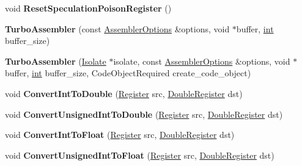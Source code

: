 \begin{DoxyCompactItemize}
void {\bfseries Reset\+Speculation\+Poison\+Register} ()
\item 
\mbox{\label{classv8_1_1internal_1_1TurboAssembler_ac5a1cdee47961f289dbb095cc534ef95}} 
{\bfseries Turbo\+Assembler} (const \mbox{\hyperlink{structv8_1_1internal_1_1AssemblerOptions}{Assembler\+Options}} \&options, void $\ast$buffer, \mbox{\hyperlink{classint}{int}} buffer\+\_\+size)
\item 
\mbox{\label{classv8_1_1internal_1_1TurboAssembler_ac5d3c303e7abed78a6c1fe7f9834c045}} 
{\bfseries Turbo\+Assembler} (\mbox{\hyperlink{classv8_1_1internal_1_1Isolate}{Isolate}} $\ast$isolate, const \mbox{\hyperlink{structv8_1_1internal_1_1AssemblerOptions}{Assembler\+Options}} \&options, void $\ast$buffer, \mbox{\hyperlink{classint}{int}} buffer\+\_\+size, Code\+Object\+Required create\+\_\+code\+\_\+object)
\item 
\mbox{\label{classv8_1_1internal_1_1TurboAssembler_a4192ffa653fd9d0538fb99353172bc9e}} 
void {\bfseries Convert\+Int\+To\+Double} (\mbox{\hyperlink{classv8_1_1internal_1_1Register}{Register}} src, \mbox{\hyperlink{classv8_1_1internal_1_1DoubleRegister}{Double\+Register}} dst)
\item 
\mbox{\label{classv8_1_1internal_1_1TurboAssembler_a30fd4cc55b4b8dc1095b29203c63c5c8}} 
void {\bfseries Convert\+Unsigned\+Int\+To\+Double} (\mbox{\hyperlink{classv8_1_1internal_1_1Register}{Register}} src, \mbox{\hyperlink{classv8_1_1internal_1_1DoubleRegister}{Double\+Register}} dst)
\item 
\mbox{\label{classv8_1_1internal_1_1TurboAssembler_a29d2614f10607799908b3a1b6a531f18}} 
void {\bfseries Convert\+Int\+To\+Float} (\mbox{\hyperlink{classv8_1_1internal_1_1Register}{Register}} src, \mbox{\hyperlink{classv8_1_1internal_1_1DoubleRegister}{Double\+Register}} dst)
\item 
\mbox{\label{classv8_1_1internal_1_1TurboAssembler_a79f97bc3bab01e6ff5cb04dd6153698d}} 
void {\bfseries Convert\+Unsigned\+Int\+To\+Float} (\mbox{\hyperlink{classv8_1_1internal_1_1Register}{Register}} src, \mbox{\hyperlink{classv8_1_1internal_1_1DoubleRegister}{Double\+Register}} dst)

\end{DoxyCompactItemize}
